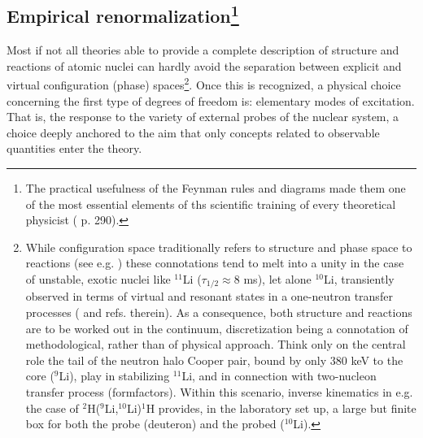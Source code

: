 \subsection[Empirical renormalization: (NFT)$_{\text{ren}}$(r+s) (Feynman + $S$-matrix)]{Empirical renormalization\footnote{The practical usefulness of the Feynman rules and diagrams made them one of the most essential elements of ths scientific training of every theoretical physicist (\cite{Mehra:96} p. 290).}} 
Most if not all theories able to provide a complete description of structure and reactions of atomic nuclei can hardly avoid the separation between explicit and virtual configuration (phase) spaces\footnote{While configuration space traditionally refers to structure and phase space to reactions (see e.g. \cite{Feshbach:62}) these connotations tend to melt into a unity in the case of unstable, exotic nuclei like $^{11}$Li ($\tau_{1/2}\approx 8$ ms), let alone $^{10}$Li, transiently observed in terms of virtual and resonant states in a one-neutron transfer processes (\cite{Cavallaro:17,Barranco:20} and refs. therein). As a consequence, both structure and reactions are to be worked out in the continuum, discretization being a connotation of methodological, rather than of physical approach. Think only on the central role the tail of the neutron halo Cooper pair, bound by only 380 keV to the core ($^9$Li), play in stabilizing $^{11}$Li, and in connection with two-nucleon transfer process (formfactors). Within this scenario, inverse kinematics in e.g. the case of $^2$H($^9$Li,$^{10}$Li)$^1$H provides, in the laboratory set up, a large but finite box for both the probe (deuteron) and the probed ($^{10}$Li).}. Once this is recognized, a physical choice concerning the first type of degrees of freedom is: elementary modes of excitation. That is, the response to the variety of external probes of the nuclear system, a choice deeply anchored to the aim that only concepts related to observable quantities enter the theory.

